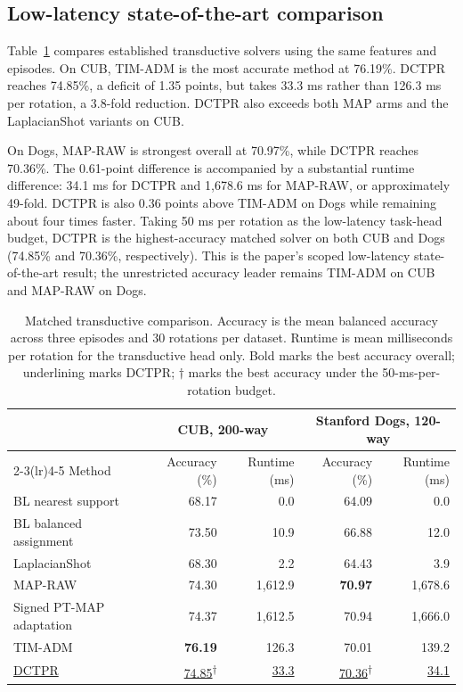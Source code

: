 \documentclass[]{spie}
\newcommand{\method}{\textsc{DCTPR}\xspace}
\begin{document}
\FloatBarrier
\subsection{Low-latency state-of-the-art comparison}

Table~\ref{tab:main} compares established transductive solvers using the same
features and episodes. On CUB, TIM-ADM is the most accurate method at 76.19\%.
\method reaches 74.85\%, a deficit of 1.35 points, but takes 33.3 ms rather
than 126.3 ms per rotation, a 3.8-fold reduction. \method also exceeds both MAP
arms and the LaplacianShot variants on CUB.

On Dogs, MAP-RAW is strongest overall at 70.97\%, while \method reaches
70.36\%. The 0.61-point difference is accompanied by a substantial runtime difference:
34.1 ms for \method and 1,678.6 ms for MAP-RAW, or approximately 49-fold.
\method is also 0.36 points above TIM-ADM on Dogs while remaining about four
times faster. Taking 50 ms per rotation as the low-latency task-head budget,
\method is the highest-accuracy matched solver on both CUB and Dogs (74.85\%
and 70.36\%, respectively). This is the paper's scoped low-latency
state-of-the-art result; the unrestricted accuracy leader remains TIM-ADM on
CUB and MAP-RAW on Dogs.

\begin{table}[!htbp]
\centering
\caption{Matched transductive comparison. Accuracy is the mean balanced
accuracy across three episodes and 30 rotations per dataset. Runtime is mean
milliseconds per rotation for the transductive head only. Bold marks the best
accuracy overall; underlining marks \method; $\dagger$ marks the best accuracy
under the 50-ms-per-rotation budget.}
\label{tab:main}
\begin{tabular}{lrrrr}
\toprule
& \multicolumn{2}{c}{CUB, 200-way} & \multicolumn{2}{c}{Stanford Dogs, 120-way} \\
\cmidrule(lr){2-3}\cmidrule(lr){4-5}
Method & Accuracy (\%) & Runtime (ms) & Accuracy (\%) & Runtime (ms) \\
\midrule
BL nearest support & 68.17 & 0.0 & 64.09 & 0.0 \\
BL balanced assignment & 73.50 & 10.9 & 66.88 & 12.0 \\
LaplacianShot & 68.30 & 2.2 & 64.43 & 3.9 \\
MAP-RAW & 74.30 & 1,612.9 & \textbf{70.97} & 1,678.6 \\
Signed PT-MAP adaptation & 74.37 & 1,612.5 & 70.94 & 1,666.0 \\
TIM-ADM & \textbf{76.19} & 126.3 & 70.01 & 139.2 \\
\underline{\method} & \underline{74.85}\textsuperscript{\(\dagger\)} & \underline{33.3} & \underline{70.36}\textsuperscript{\(\dagger\)} & \underline{34.1} \\
\bottomrule
\end{tabular}
\end{table}
\end{document}
